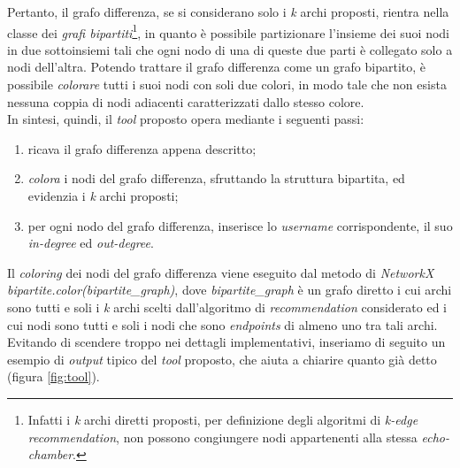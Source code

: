 Pertanto, il grafo differenza, se si considerano solo i \textit{k} archi proposti, rientra nella classe dei \textit{grafi bipartiti}\footnote{Infatti i \textit{k} archi diretti proposti, per definizione degli algoritmi di \textit{k-edge recommendation}, non possono congiungere nodi appartenenti alla stessa \textit{echo-chamber}.}, in quanto è possibile partizionare l'insieme dei suoi nodi in due sottoinsiemi tali che ogni nodo di una di queste due parti è collegato solo a nodi dell'altra. Potendo trattare il grafo differenza come un grafo bipartito, è possibile \textit{colorare} tutti i suoi nodi con soli due colori, in modo tale che non esista nessuna coppia di nodi adiacenti caratterizzati dallo stesso colore. 
\\In sintesi, quindi, il \textit{tool} proposto opera mediante i seguenti passi:
\begin{enumerate}
\item ricava il grafo differenza appena descritto;
\item \textit{colora} i nodi del grafo differenza, sfruttando la struttura bipartita, ed evidenzia i \textit{k} archi proposti;
\item per ogni nodo del grafo differenza, inserisce lo \textit{username} corrispondente, il suo \textit{in-degree} ed \textit{out-degree}.
\end{enumerate}

Il \textit{coloring} dei nodi del grafo differenza viene eseguito dal metodo di \textit{NetworkX} \textit{bipartite.color(bipartite\_graph)}, dove \textit{bipartite\_graph} è un grafo diretto i cui archi sono tutti e soli i \textit{k} archi scelti dall'algoritmo di \textit{recommendation} considerato ed i cui nodi sono tutti e soli i nodi che sono \textit{endpoints} di almeno uno tra tali archi. 
\\Evitando di scendere troppo nei dettagli implementativi, inseriamo di seguito un esempio di \textit{output} tipico del \textit{tool} proposto, che aiuta a chiarire quanto già detto (figura \ref{fig:tool}).

